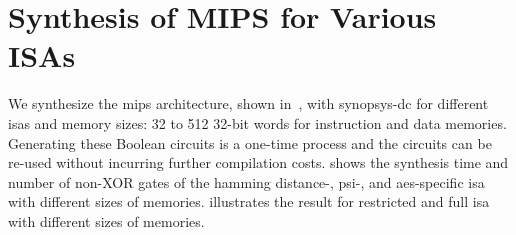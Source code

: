 \section{Synthesis of MIPS for Various ISAs}
We synthesize the \gls{mips} architecture, shown in~, with \gls{synopsys-dc} for different \acrshort{isa}s and memory sizes: 32 to 512 32-bit words for instruction and data memories.
Generating these Boolean circuits is a one-time process and the circuits can be re-used without incurring further compilation costs.
 shows the synthesis time and number of non-XOR gates of the hamming distance-, \acrshort{psi}-, and \acrshort{aes}-specific \acrshort{isa} with different sizes of memories.
 illustrates the result for restricted and full \acrshort{isa} with different sizes of memories.

